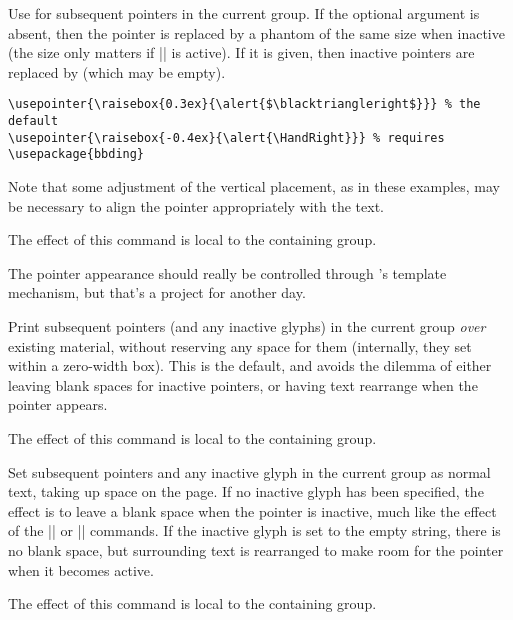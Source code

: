 \documentclass[a4paper]{ltxdoc}
\begin{document}
\begin{command}{\usepointer{}}
  Use  for subsequent pointers in the current group.  If the
  optional argument is absent, then the pointer is replaced by a phantom of the
  same size when inactive (the size only matters if |\useuncoverpointer| is
  active).  If it is given, then inactive pointers are replaced by
   (which may be empty).  \example
\begin{verbatim}
\usepointer{\raisebox{0.3ex}{\alert{$\blacktriangleright$}}} % the default
\usepointer{\raisebox{-0.4ex}{\alert{\HandRight}}} % requires \usepackage{bbding}
\end{verbatim}
Note that some adjustment of the vertical placement, as in these examples, may
be necessary to align the pointer appropriately with the text.

The effect of this command is local to the containing group. 

The pointer appearance should really be controlled through \beamer's template
mechanism, but that's a project for another day.
\end{command}

\begin{command}{\useoverprintpointer}
  Print subsequent pointers (and any inactive glyphs) in the current group
  \emph{over} existing material, without reserving any space for them
  (internally, they set within a zero-width box). This is the default, and
  avoids the dilemma of either leaving blank spaces for inactive pointers, or
  having text rearrange when the pointer appears.

  The effect of this command is local to the containing group. 
\end{command}

\begin{command}{\useuncoverpointer}
  Set subsequent pointers and any inactive glyph in the current group as normal
  text, taking up space on the page.  If no inactive glyph has been specified,
  the effect is to leave a blank space when the pointer is inactive, much like
  the effect of the |\uncover| or |\onslide| commands.  If the inactive glyph is
  set to the empty string, there is no blank space, but surrounding text is
  rearranged to make room for the pointer when it becomes active.

  The effect of this command is local to the containing group. 
\end{command}
\end{document}
